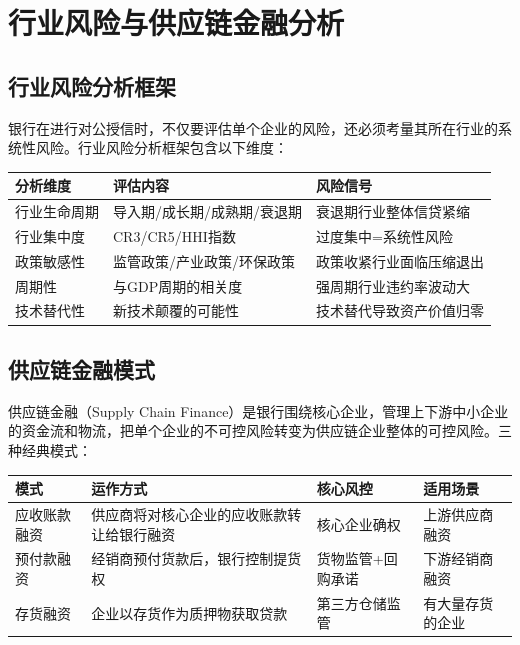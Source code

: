 \section{行业风险与供应链金融分析}

\subsection{行业风险分析框架}

银行在进行对公授信时，不仅要评估单个企业的风险，还必须考量其所在行业的系统性风险。行业风险分析框架包含以下维度：

\begin{table}[H]
\centering
\begin{tabular}{lp{5cm}p{5cm}}
\toprule
\textbf{分析维度} & \textbf{评估内容} & \textbf{风险信号} \\
\midrule
行业生命周期 & 导入期/成长期/成熟期/衰退期 & 衰退期行业整体信贷紧缩 \\
行业集中度 & CR3/CR5/HHI指数 & 过度集中=系统性风险 \\
政策敏感性 & 监管政策/产业政策/环保政策 & 政策收紧行业面临压缩退出 \\
周期性 & 与GDP周期的相关度 & 强周期行业违约率波动大 \\
技术替代性 & 新技术颠覆的可能性 & 技术替代导致资产价值归零 \\
\bottomrule
\end{tabular}
\end{table}

\subsection{供应链金融模式}

供应链金融（Supply Chain Finance）是银行围绕核心企业，管理上下游中小企业的资金流和物流，把单个企业的不可控风险转变为供应链企业整体的可控风险。三种经典模式：

\begin{table}[H]
\centering
\begin{tabular}{lp{4cm}p{3cm}p{4cm}}
\toprule
\textbf{模式} & \textbf{运作方式} & \textbf{核心风控} & \textbf{适用场景} \\
\midrule
应收账款融资 & 供应商将对核心企业的应收账款转让给银行融资 & 核心企业确权 & 上游供应商融资 \\
预付款融资 & 经销商预付货款后，银行控制提货权 & 货物监管+回购承诺 & 下游经销商融资 \\
存货融资 & 企业以存货作为质押物获取贷款 & 第三方仓储监管 & 有大量存货的企业 \\
\bottomrule
\end{tabular}
\end{table}

